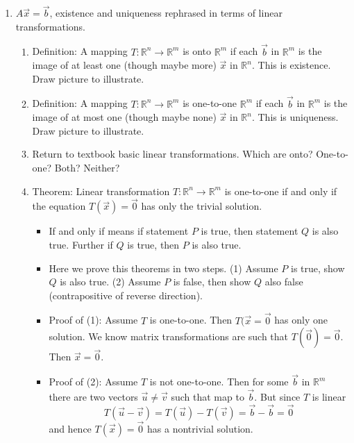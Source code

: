 \documentclass{article}
\begin{document}
\begin{enumerate}
\item $A\vec{x} = \vec{b}$, existence and uniqueness rephrased in terms of linear transformations.
\begin{enumerate}
\item Definition: A mapping $T:\mathbb{R}^n \rightarrow \mathbb{R}^m$ is onto $\mathbb{R}^m$ if each $\vec{b}$ in $\mathbb{R}^m$ is the image of at least one (though maybe more) $\vec{x}$ in $\mathbb{R}^n$. This is existence. Draw picture to illustrate.

\item Definition: A mapping $T:\mathbb{R}^n \rightarrow \mathbb{R}^m$ is one-to-one $\mathbb{R}^m$ if each $\vec{b}$ in $\mathbb{R}^m$ is the image of at most one (though maybe none) $\vec{x}$ in $\mathbb{R}^n$. This is uniqueness. Draw picture to illustrate.

\item Return to textbook basic linear transformations. Which are onto? One-to-one? Both? Neither?

\item Theorem: Linear transformation $T:\mathbb{R}^n \rightarrow \mathbb{R}^m$ is one-to-one if and only if the equation $T(\vec{x})=\vec{0}$ has only the trivial solution.
\begin{itemize}

\item If and only if means if statement $P$ is true, then statement $Q$ is also true. Further if $Q$ is true, then $P$ is also true.

\item Here we prove this theorems in two steps. (1) Assume $P$ is true, show $Q$ is also true. (2) Assume $P$ is false, then show $Q$ also false (contrapositive of reverse direction).

\item Proof of (1): Assume $T$ is one-to-one. Then $T(\vec{x}=\vec{0}$ has only one solution. We know matrix transformations are such that $T(\vec{0})=\vec{0}$. Then $\vec{x}=\vec{0}$.

\item Proof of (2): Assume $T$ is not one-to-one. Then for some $\vec{b}$ in $\mathbb{R}^m$ there are two vectors $\vec{u} \neq \vec{v}$ such that map to $\vec{b}$. But since $T$ is linear
\[
T(\vec{u}-\vec{v}) = T(\vec{u})-T(\vec{v}) = \vec{b}-\vec{b}=\vec{0}
\]
and hence $T(\vec{x})=\vec{0}$ has a nontrivial solution.
\end{itemize}


\end{enumerate}
\end{enumerate}
\end{document}
